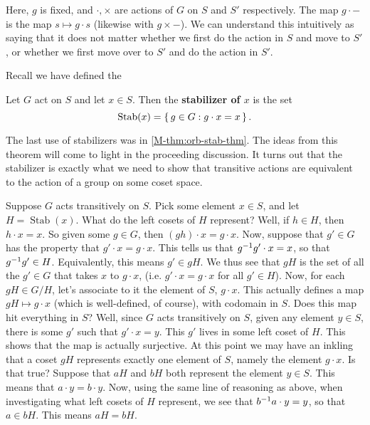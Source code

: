 \documentclass[./main.tex]{subfiles}
\begin{document}
Here, $g$ is fixed, and $\cdot, \times$ are actions of $G$ on $S$ and $S'$
respectively. The map $g \cdot -$ is the map $s \mapsto g \cdot s$ (likewise
with $g \times -$). We can understand this intuitively as saying that it does
not matter whether we first do the action in $S$ and move to $S'$, or whether we
first move over to $S'$ and do the action in $S'$.

Recall we have defined the
\begin{definition}
    Let $G$ act on $S$ and let $x \in S$. Then the \textbf{stabilizer of $x$} is the set 
    \[
        \operatorname{Stab}(x) = \set{ g \in G: g \cdot x = x}.
    \]
\end{definition}
The last use of stabilizers was in \cref{M-thm:orb-stab-thm}. The ideas from this
theorem will come to light in the proceeding discussion. It turns out that the
stabilizer is exactly what we need to show that transitive actions are
equivalent to the action of a group on some coset space. 

Suppose $G$ acts transitively on $S$. Pick some element $x \in S$, and let $H =
\operatorname{Stab}(x)$. What do the left cosets of $H$ represent? Well, if $h
\in H$, then $h \cdot x = x$. So given some $g \in G$, then $(gh) \cdot x = g
\cdot x$. Now, suppose that $g' \in G$ has the property that $g' \cdot x = g
\cdot x$. This tells us that $g^{-1} g' \cdot x = x$, so that $g^{-1} g' \in H$.
Equivalently, this means $g' \in gH$. We thus see that $gH$ is the set of all
the $g' \in G$ that takes $x$ to $g \cdot x$, (i.e. $g' \cdot x = g \cdot x$ for
all $g' \in H$). Now, for each $gH \in G/H$, let's associate to it the element
of $S$, $g \cdot x$. This actually defines a map $gH \mapsto g \cdot x$ (which
is well-defined, of course), with codomain in $S$. Does this map hit everything
in $S$? Well, since $G$ acts transitively on $S$, given any element $y \in S$,
there is some $g'$ such that $g' \cdot x = y$. This $g'$ lives in some left
coset of $H$. This shows that the map is actually surjective. At this point we
may have an inkling that a coset $gH$ represents exactly one element of $S$,
namely the element $g \cdot x$. Is that true? Suppose that $aH$ and $bH$ both
represent the element $y \in S$. This means that $a \cdot y = b \cdot y$. Now,
using the same line of reasoning as above, when investigating what left cosets
of $H$ represent, we see that $b^{-1} a \cdot y = y$, so that $a \in bH$. This
means $aH = bH$.
\end{document}
